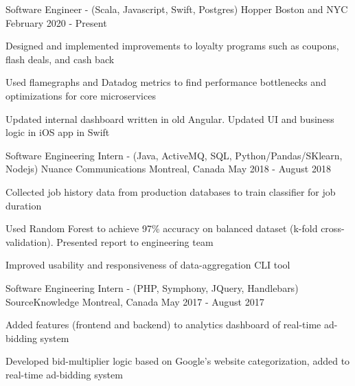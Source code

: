 


\begin{cventries}


\cventry
  {Software Engineer - (Scala, Javascript, Swift, Postgres)} %
  {Hopper} %
  {Boston and NYC} %
  {February 2020 - Present} %
  { %
    \begin{cvitems}
    \item {Designed and implemented improvements to loyalty programs such as coupons, flash deals, and cash back}
    \item {Used flamegraphs and Datadog metrics to find performance bottlenecks and optimizations for core microservices}
    \item {Updated internal dashboard written in old Angular. Updated UI and business logic in iOS app in Swift}
    \end{cvitems}
  }


\cventry
{Software Engineering Intern - (Java, ActiveMQ, SQL, Python/Pandas/SKlearn, Nodejs)} %
{Nuance Communications} %
{Montreal, Canada} %
{May 2018 - August 2018} %
{ %
\begin{cvitems}
\item {Collected job history data from production databases to train classifier for job duration}
\item {Used Random Forest to achieve 97\% accuracy on balanced dataset (k-fold cross-validation). Presented report to engineering team}
\item {Improved usability and responsiveness of data-aggregation CLI tool}
\end{cvitems}
}


\cventry
{Software Engineering Intern - (PHP, Symphony, JQuery, Handlebars)} %
{SourceKnowledge} %
{Montreal, Canada} %
{May 2017 - August 2017} %
{ %
\begin{cvitems}
\item {Added features (frontend and backend) to analytics dashboard of real-time ad-bidding system}
\item {Developed bid-multiplier logic based on Google's website categorization, added to real-time ad-bidding system}
\end{cvitems}
}


\end{cventries}

